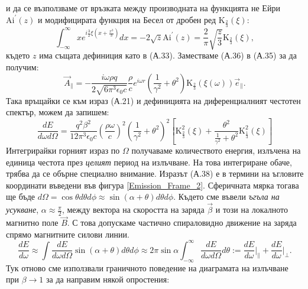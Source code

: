 \begin{appendices}
\begin{equation}
\end{equation}
и да се възползваме от връзката между производната на функцията не Ейри $\text{Ai}^\prime(z)$ и модифицирата функция на Бесел от дробен ред $\text{K}_{\frac{2}{3}}(\xi)$:
\begin{equation}
	\int_{-\infty}^\infty x e^{i\frac{3}{2}\xi\left(x + \frac{x^3}{3}\right)}dx = -2\sqrt{z}\text{Ai}^\prime (z) =\frac{2}{\pi}\sqrt{\frac{z}{3}}\text{K}_{\frac{2}{3}}(\xi),
\end{equation}
където $z$ има същата дефиниция като в (А.33). Заместваме (А.36) в (А.35) за да получим:
\begin{equation}
	\vec{A}_\parallel = -\frac{i\omega\rho q}{2\sqrt{6\pi^3\epsilon_0 c}}\frac{\rho}{c}e^{i\omega r}\left( \frac{1}{\gamma^2} + \theta^2 \right) \text{K}_{\frac{2}{3}}(\xi(\omega))\vec{e}_\parallel.
\end{equation}
Така връщайки се към израз (А.21) и дефиницията на диференциалният честотен спектър, можем да запишем:
\begin{equation}
	\frac{dE}{d\omega d\Omega} = \frac{q^2\beta^2}{12\pi^3\epsilon_0 c}\left(\frac{\rho\omega}{c}\right)^2\left(\frac{1}{\gamma^2}+\theta^2\right)^2\left[\text{K}^2_{\frac{2}{3}}(\xi) + \frac{\theta^2}{\frac{1}{\gamma^2} + \theta^2}\text{K}^2_{\frac{1}{3}}(\xi)\right]
\end{equation}
Интегрирайки горният израз по $\Omega$ получаваме количеството енергия, излъчена на единица честота през \emph{целият} период на излъчване. На това интегриране обаче, трябва да се обърне специално внимание. Изразът (А.38) е в термини на ъгловите координати въведени във фигура \ref{Emission_Frame_2}. Сферичната мярка тогава ще бъде $d\Omega = \cos\theta d\theta d\phi \approx \sin(\alpha + \theta) d\theta d\phi $. Където сме въвели \emph{ъгъла на усукване}, $\alpha \approx \frac{\pi}{2}$, между вектора на скоростта на заряда $\vec{\beta}$ и този на локалното магнитно поле $\vec{B}$. С това допускаме частично спираловидно движение на заряда спрямо магнитните силови линии.
\begin{equation}
	\frac{dE}{d\omega} \approx \int \frac{dE}{d\omega d\Omega} \sin(\alpha + \theta) d\theta d\phi \approx 2\pi \sin\alpha \int_{-\infty}^\infty \frac{dE}{d\omega d\Omega}d\theta:=\frac{dE}{d\omega}\bigg\vert_\parallel + \frac{dE}{d\omega}\bigg\vert_\perp.
\end{equation}
Тук отново сме използвали граничното поведение на диаграмата на излъчване при $\beta\rightarrow 1$ за да направим някой опростения:\\


\end{appendices}
